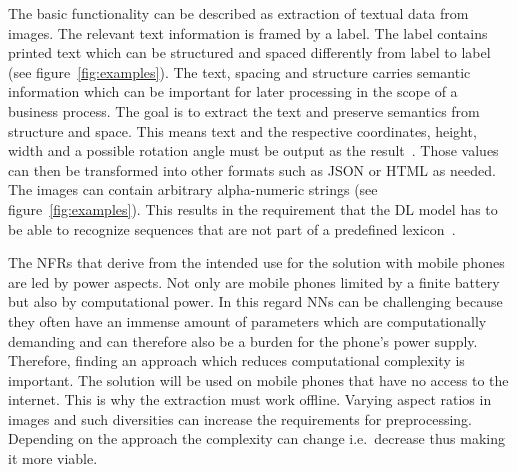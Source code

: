 
The basic functionality can be described as extraction of textual data from images.
The relevant text information is framed by a label.
The label contains printed text which can be structured and spaced differently from label to
label (see figure~\ref{fig:examples}).
The text, spacing and structure carries semantic information which can be important for later
processing in the scope of a business process.
The goal is to extract the text and preserve semantics from structure and space.
This means text and the respective coordinates, height, width and a possible rotation angle must
be output as the result~\cite{yang_learning_2021}.
Those values can then be transformed into other formats such as JSON or HTML as needed.
The images can contain arbitrary alpha-numeric strings (see figure~\ref{fig:examples}).
This results in the requirement that the \ac{DL} model has to be able to recognize sequences that
are not part of a predefined lexicon~\cite{ghosh_visual_2017}.


The \acp{NFR} that derive from the intended use for the solution with mobile phones are led by
power aspects.
Not only are mobile phones limited by a finite battery but also by computational power.
In this regard \acp{NN} can be challenging because they often have an immense amount of parameters
which are computationally demanding and can therefore also be a burden for the phone's power supply.
Therefore, finding an approach which reduces computational complexity is important.
The solution will be used on mobile phones that have no access to the internet.
This is why the extraction must work offline.
Varying aspect ratios in images and such diversities can increase the requirements for preprocessing.
Depending on the approach the complexity can change i.e.\ decrease thus making it more viable.

